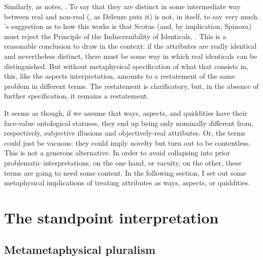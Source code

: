 \documentclass[11pt]{article}
\begin{document}
	Similarly, as \citeauthor{schmidtFormalDistinction} notes, . To say that they are distinct in some intermediate way between real and non-real (, as Deleuze puts it) is not, in itself, to say very much. 's suggestion as to how this works is that Scotus (and, by implication, Spinoza) must reject the Principle of the Indiscernibility of Identicals, . This is a reasonable conclusion to draw in the context: if the attributes are really identical and nevertheless distinct, there must be some way in which real identicals can be distinguished. But without metaphysical specification of what that consists in, this, like the aspects interpretation, amounts to a restatement of the same problem in different terms. The restatement is clarificatory, but, in the absence of further specification, it remains a restatement.
	
	It seems as though, if we assume that ways, aspects, and quiddities have their face-value ontological statuses, they end up being only nominally different from, respectively, subjective illusions and objectively-real attributes. Or, the terms could just be vacuous: they could imply novelty but turn out to be contentless. This is not a generous alternative. In order to avoid collapsing into prior problematic interpretations, on the one hand, or vacuity, on the other, these terms are going to need some content. In the following section, I set out some metaphysical implications of treating attributes as ways, aspects, or quiddities.
	
	\section{The standpoint interpretation} \label{sec:StandpointInt}
	
	\subsection{Metametaphysical pluralism} \label{subsec:MMP}
	
\end{document}
